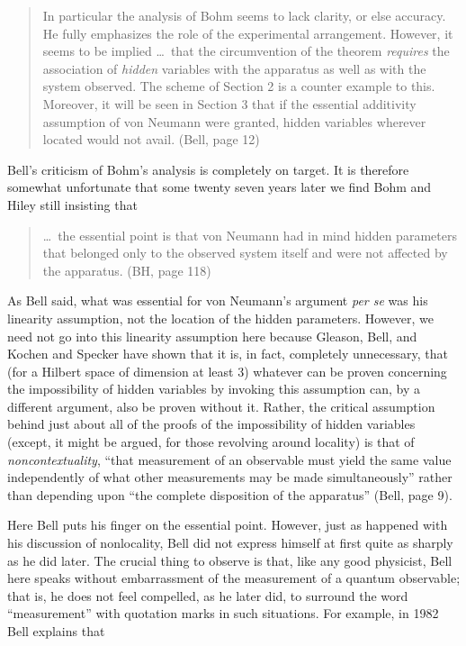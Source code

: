 \documentclass[12pt]{article}
\newcommand\bq{\begin{quotation}}
\newcommand\eq{\end{quotation}}
\begin{document}
\bq\noindent In particular the analysis of Bohm seems to lack clarity, or else
accuracy. He fully emphasizes the role of the experimental arrangement.
However, it seems to be implied \dots\  that the circumvention of the theorem
{\it requires}  the association of {\it hidden} variables with the
apparatus as well as with the system observed. The scheme of Section 2
is a counter example to this. Moreover, it will be seen in Section 3 that
if the essential additivity assumption of von Neumann were granted, hidden
variables wherever located would not avail. (Bell, page 12)
\eq
Bell's criticism of Bohm's analysis is completely on target. It is therefore
somewhat unfortunate that some twenty seven years later we find Bohm and Hiley
still insisting that

\bq \noindent\dots\  the essential point is that von Neumann had in mind hidden
parameters that belonged only to the observed system itself and were not
affected by the apparatus. (BH, page 118)
\eq

As Bell said, what was essential for von Neumann's argument {\it per se}
was his linearity assumption, not the location of the hidden parameters.
However, we need not go into this linearity assumption here because
Gleason, Bell, and Kochen and Specker have shown that it is, in fact,
completely unnecessary, that (for a Hilbert space of dimension at least 3)
whatever can be proven concerning the impossibility of hidden variables by
invoking this assumption can, by a different argument, also be proven
without it. Rather, the critical assumption behind just about all of the
proofs of the impossibility of hidden variables (except, it might be
argued, for those revolving around locality) is that of {\it
noncontextuality}, ``that measurement of an observable must yield the
same value independently of what other measurements may be made
simultaneously'' rather than depending upon ``the complete disposition of
the apparatus'' (Bell, page 9).

Here Bell puts his finger on the essential point. However, just as happened
with his discussion of nonlocality, Bell did not express himself at first
quite as sharply as he did later. The crucial thing to observe is that,
like any good physicist, Bell here speaks without embarrassment of the
measurement of a quantum observable; that is, he does not feel compelled,
as he later did, to surround the word ``measurement'' with quotation marks
in such situations. For example, in 1982 Bell explains that
\end{document}
